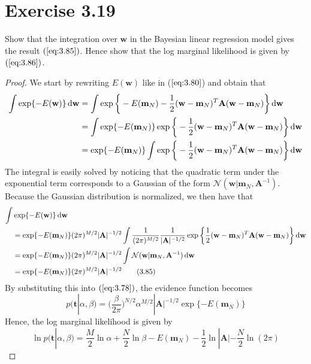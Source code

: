 \section*{Exercise 3.19}
Show that the integration over $\mathbf{w}$ in the Bayesian 
linear regression model gives the result $(\ref{eq:3.85})$.
Hence show that the log marginal likelihood is given by 
$(\ref{eq:3.86})$.

\vspace{1em}

\begin{proof}
    We start by rewriting $E(\mathbf{w})$ like in ($\ref{eq:3.80}$) and obtain that
    \begin{align*}
        \int \exp\{-E(\mathbf{w})\} \mathop{}\!\mathrm{d} \mathbf{w}
        &= \int \exp\bigg\{-E(\mathbf{m}_N) -
            \frac{1}{2} (\mathbf{w} - \mathbf{m}_N)^T\mathbf{A}(\mathbf{w} - \mathbf{m}_N)
            \bigg\}\mathop{}\!\mathrm{d} \mathbf{w} \\
        &= \int \exp\{-E(\mathbf{m}_N)\}
            \exp\bigg\{-\frac{1}{2} (\mathbf{w} - \mathbf{m}_N)^T\mathbf{A}(\mathbf{w} - \mathbf{m}_N)
            \bigg\}\mathop{}\!\mathrm{d} \mathbf{w} \\
        &= \exp\{-E(\mathbf{m}_N)\}  
            \int \exp\bigg\{-\frac{1}{2} (\mathbf{w} - \mathbf{m}_N)^T\mathbf{A}(\mathbf{w} - \mathbf{m}_N)
            \bigg\}\mathop{}\!\mathrm{d} \mathbf{w}
    \end{align*}
    The integral is easily solved by noticing that the quadratic 
    term under the exponential term corresponds to a Gaussian of
    the form $\mathcal{N}(\mathbf{w} | \mathbf{m}_N, \mathbf{A}^{-1})$.
    Because the Gaussian distribution is normalized, we then have that
    \begin{align*}
        \int &\exp\{-E(\mathbf{w})\} \mathop{}\!\mathrm{d} \mathbf{w} \\
        &= \exp\{-E(\mathbf{m}_N)\} (2\pi)^{M / 2} |\mathbf{A}|^{-1/2}
            \int\frac{1}{(2\pi)^{M/2}}\frac{1}{|\mathbf{A}|^{-1/2}}
            \exp\bigg\{\frac{1}{2}
                (\mathbf{w} - \mathbf{m}_N)^T\mathbf{A}(\mathbf{w} - \mathbf{m}_N)
            \bigg\}\mathop{}\!\mathrm{d} \mathbf{w} \\
        &= \exp\{-E(\mathbf{m}_N)\} (2\pi)^{M / 2} |\mathbf{A}|^{-1/2}
            \int \mathcal{N}(\mathbf{w} | \mathbf{m}_N, \mathbf{A}^{-1}) \mathop{}\!\mathrm{d} \mathbf{w} \\
        &= \exp\{-E(\mathbf{m}_N)\} (2\pi)^{M / 2} |\mathbf{A}|^{-1/2} \label{eq:3.85}\tag{3.85}
    \end{align*}
    By substituting this into $(\ref{eq:3.78})$, the evidence function becomes
    \[
        p(\mathbf{t} | \alpha, \beta) 
        = \bigg(\frac{\beta}{2\pi}\bigg)^{N / 2} \alpha^{M/2} |\mathbf{A}|^{-1/2}
            \exp\{-E(\mathbf{m}_N)\}
    \] 
    Hence, the log marginal likelihood is given by
    \begin{equation}\label{eq:3.86}\tag{3.86}
        \ln p(\mathbf{t} | \alpha, \beta)
        = \frac{M}{2} \ln \alpha + \frac{N}{2} \ln \beta - E(\mathbf{m}_N)
            -\frac{1}{2} \ln|\mathbf{A}| - \frac{N}{2} \ln(2\pi)
    \end{equation}
\end{proof}
